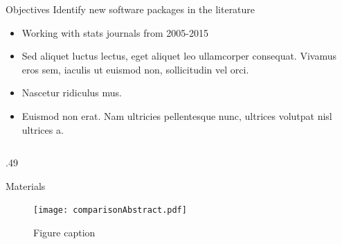 \documentclass[final]{beamer}
\newlength{\sepwid}
\newlength{\onecolwid}
\begin{document}
\begin{frame}{}
\begin{columns}[t]
\begin{column}{\onecolwid}
	\end{column} 


\begin{column}{\onecolwid} %
	\begin{alertblock}{Objectives}
		Identify new software packages in the literature
		\begin{itemize}
			\item Working with stats journals from 2005-2015
			\item Sed aliquet luctus lectus, eget aliquet leo ullamcorper consequat. Vivamus eros sem, iaculis ut euismod non, sollicitudin vel orci.
			\item Nascetur ridiculus mus.  
			\item Euismod non erat. Nam ultricies pellentesque nunc, ultrices volutpat nisl ultrices a.
		\end{itemize}
	\end{alertblock}

			

\begin{columns}[t,totalwidth=\onecolwid] %
	
	\begin{column}{.49\onecolwid}\vspace{-.6in} %
		
		
		\begin{block}{Materials}
			
			\begin{figure}
				\texttt{[image: comparisonAbstract.pdf]}
				\caption{Figure caption}
			\end{figure}
			
		\end{block}
		
	\end{column} %
	

\end{columns}
\end{column}
\end{columns}
\end{frame}
\end{document}
